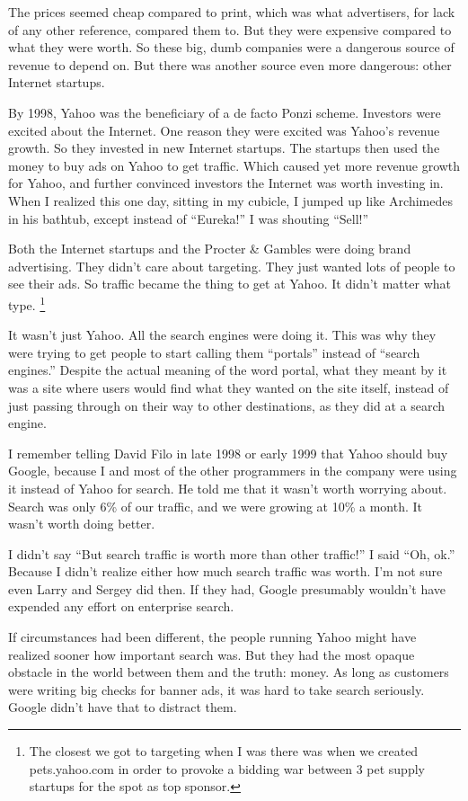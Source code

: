 The prices seemed cheap compared to print, which was what advertisers,
for lack of any other reference, compared them to. But they were
expensive compared to what they were worth. So these big, dumb companies
were a dangerous source of revenue to depend on. But there was another
source even more dangerous: other Internet startups.

By 1998, Yahoo was the beneficiary of a de facto Ponzi scheme. Investors
were excited about the Internet. One reason they were excited was
Yahoo's revenue growth. So they invested in new Internet startups. The
startups then used the money to buy ads on Yahoo to get traffic. Which
caused yet more revenue growth for Yahoo, and further convinced
investors the Internet was worth investing in. When I realized this one
day, sitting in my cubicle, I jumped up like Archimedes in his bathtub,
except instead of ``Eureka!'' I was shouting ``Sell!''

Both the Internet startups and the Procter \& Gambles were doing brand
advertising. They didn't care about targeting. They just wanted lots of
people to see their ads. So traffic became the thing to get at Yahoo. It
didn't matter what type. \footnote{The closest we got to targeting when I was there was when we
created pets.yahoo.com in order to provoke a bidding war between 3 pet
supply startups for the spot as top sponsor.}

It wasn't just Yahoo. All the search engines were doing it. This was why
they were trying to get people to start calling them ``portals'' instead
of ``search engines.'' Despite the actual meaning of the word portal,
what they meant by it was a site where users would find what they wanted
on the site itself, instead of just passing through on their way to
other destinations, as they did at a search engine.

I remember telling David Filo in late 1998 or early 1999 that Yahoo
should buy Google, because I and most of the other programmers in the
company were using it instead of Yahoo for search. He told me that it
wasn't worth worrying about. Search was only 6\% of our traffic, and we
were growing at 10\% a month. It wasn't worth doing better.

I didn't say ``But search traffic is worth more than other traffic!'' I
said ``Oh, ok.'' Because I didn't realize either how much search traffic
was worth. I'm not sure even Larry and Sergey did then. If they had,
Google presumably wouldn't have expended any effort on enterprise
search.

If circumstances had been different, the people running Yahoo might have
realized sooner how important search was. But they had the most opaque
obstacle in the world between them and the truth: money. As long as
customers were writing big checks for banner ads, it was hard to take
search seriously. Google didn't have that to distract them.

